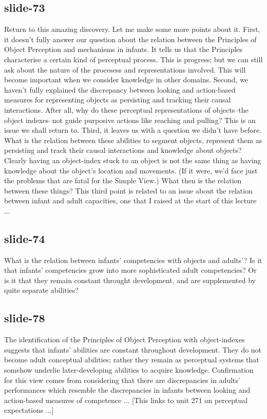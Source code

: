 \documentclass[12pt,\papersize]{extarticle}
\begin{document}
\subsection{slide-73}
Return to this amazing discovery.
Let me make some more points about it.
First, it doesn't fully answer our question about the relation between the Principles of Object Perception and mechanisms in infants. It tells us that the Principles characterise a certain kind of perceptual process. This is progress; but we can still ask about the nature of the procesess and representations involved. This will become important when we consider knowledge in other domains.
Second, we haven't fully explained the discrepancy between looking and action-based measures for representing objects as persisting and tracking their causal interactions. After all, why do these perceptual representations of objects--the object indexes--not guide purposive actions like reaching and pulling? This is an issue we shall return to.
Third, it leaves us with a question we didn't have before. What is the relation between these abilities to segment objects, represent them as persisting and track their causal interactions and knowledge about objects? Clearly having an object-index stuck to an object is not the same thing as having knowledge about the object's location and movements. (If it were, we'd face just the problems that are fatal for the Simple View.) What then is the relation between these things?
This third point is related to an issue about the relation between infant and adult capacities, one that I raised at the start of this lecture ...
 
 
\subsection{slide-74}
What is the relation between infants' competencies with objects and adults'? Is it that infants' competencies grow into more sophisticated adult competencies? Or is it that they remain constant throught development, and are supplemented by quite separate abilities?
 
 
\subsection{slide-78}
The identification of the Principles of Object Perception with object-indexes suggests that infants' abilities are constant throughout development. They do not become adult conceptual abilities; rather they remain as perceptual systems that somehow underlie later-developing abilities to acquire knowledge.
Confirmation for this view comes from considering that there are discrepancies in adults' performances which resemble the discrepancies in infants between looking and action-based measures of competence ... [This links to unit 271 on perceptual expectations ...]
 
\end{document}
